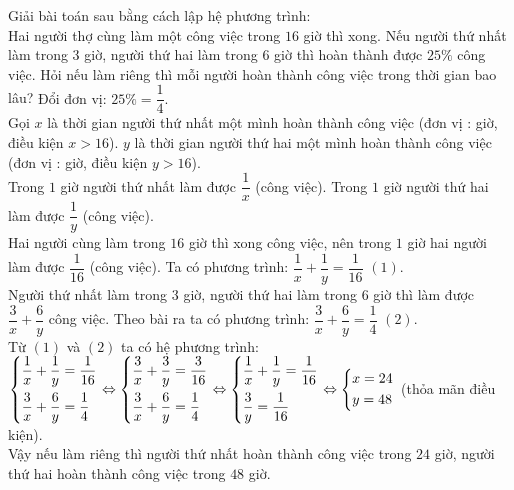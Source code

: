 \begin{ex}%
    Giải bài toán sau bằng cách lập hệ phương trình:\\
    Hai người thợ cùng làm một công việc trong $16$ giờ thì xong. Nếu người thứ 
    nhất làm trong $3$ giờ, người thứ hai làm trong $6$ giờ thì hoàn thành được $25\%$ công việc. Hỏi nếu làm riêng thì mỗi người hoàn thành công việc trong thời gian bao lâu?
   \loigiai
    {
   Đổi đơn vị: $25\%=\dfrac{1}{4}$.\\
   Gọi $x$ là thời gian người thứ nhất một mình hoàn thành công việc (đơn vị : giờ, điều kiện $x>16$).
   $y$ là thời gian người thứ hai một mình hoàn thành công việc (đơn vị : giờ, điều kiện $y>16$).\\
   Trong $1$ giờ người thứ nhất làm được $\dfrac{1}{x}$ (công việc).
   Trong $1$ giờ người thứ hai làm được $\dfrac{1}{y}$ (công việc).\\
   Hai người cùng làm trong $16$ giờ thì xong công việc, nên trong $1$ giờ hai 
   người làm được $\dfrac{1}{16}$ (công việc). 
   Ta có phương trình: $\dfrac{1}{x}+\dfrac{1}{y}=\dfrac{1}{16}$   $(1)$. \\
   Người thứ nhất làm trong $3$ giờ, người thứ hai làm trong $6$ giờ thì làm được  
   $\dfrac{3}{x}+\dfrac{6}{y}$ công việc. Theo bài ra ta có phương trình: 
   $\dfrac{3}{x}+\dfrac{6}{y}=\dfrac{1}{4}$ $(2)$.\\
   Từ $(1)$ và $(2)$ ta có hệ phương trình: 
   $\left\{\begin{aligned}&\dfrac{1}{x}+\dfrac{1}{y}=\dfrac{1}{16} \\& \dfrac{3}{x}+\dfrac{6}{y}=\dfrac{1}{4}\end{aligned}\right.\Leftrightarrow \left\{\begin{aligned}
   	& \dfrac{3}{x}+\dfrac{3}{y}=\dfrac{3}{16} \\ 
   	& \dfrac{3}{x}+\dfrac{6}{y}=\dfrac{1}{4}\end{aligned}\right.\Leftrightarrow \left\{\begin{aligned}
   	& \dfrac{1}{x}+\dfrac{1}{y}=\dfrac{1}{16} \\ 
   	& \dfrac{3}{y}=\dfrac{1}{16}\end{aligned}\right.\Leftrightarrow \left\{\begin{aligned}
   	& x=24 \\& y=48\end{aligned}\right.$ (thỏa mãn điều kiện).\\
   Vậy nếu làm riêng thì người thứ nhất hoàn thành công việc trong $24$ giờ, người thứ hai hoàn thành công việc trong $48$ giờ.
    }
\end{ex}


